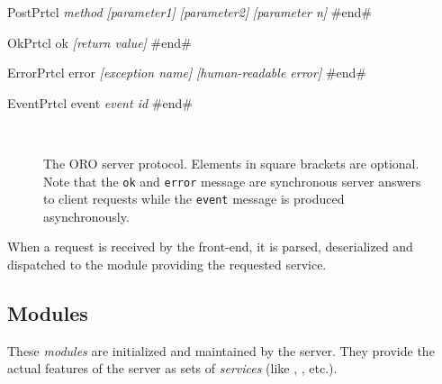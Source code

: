 \begin{SaveVerbatim}[frame=single, commandchars=\\\{\}]{PostPrtcl}
\emph{method}
\emph{[parameter1]}
\emph{[parameter2]}
\emph{[parameter n]}
#end#
\end{SaveVerbatim}

\begin{SaveVerbatim}[frame=single, commandchars=\\\{\}]{OkPrtcl}
ok
\emph{[return value]}
#end#
\end{SaveVerbatim}

\begin{SaveVerbatim}[frame=single, commandchars=\\\{\}]{ErrorPrtcl}
error
\emph{[exception name]}
\emph{[human-readable error]}
#end#
\end{SaveVerbatim}

\begin{SaveVerbatim}[frame=single, commandchars=\\\{\}]{EventPrtcl}
event
\emph{event id}
#end#
\end{SaveVerbatim}

\begin{figure}
\centering

 \\

\caption{The ORO server protocol. Elements in square brackets are optional.
Note that the {\tt ok} and {\tt error} message are synchronous server answers
to client requests while the {\tt event} message is produced asynchronously.}

\label{fig|oro-protocol}

\end{figure}

When a request is received by the front-end, it is parsed, deserialized and
dispatched to the module providing the requested service.

\subsection{Modules}

These \emph{modules} are initialized and maintained by the server. They provide
the actual features of the server as sets of \emph{services} (like ,
, etc.).

